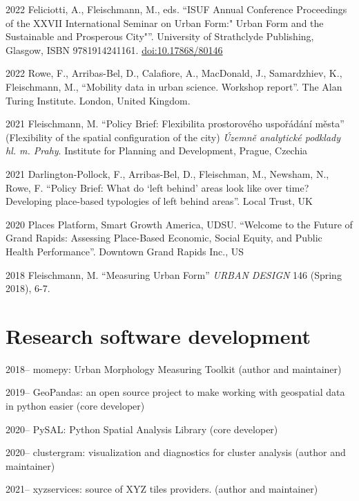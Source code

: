 \documentclass[12pt,a4paper]{report}
\begin{document}
    \begin{tablist}

        \item[2022] \tab{}Feliciotti, A., Fleischmann, M., eds. \enquote{ISUF Annual Conference Proceedings of the XXVII International Seminar on Urban Form:" Urban Form and the Sustainable and Prosperous City"}. University of Strathclyde Publishing, Glasgow, ISBN 9781914241161. \href{https://doi.org/10.17868/80146}{doi:10.17868/80146}
        \item[2022] \tab{}Rowe, F., Arribas-Bel, D., Calafiore, A., MacDonald, J., Samardzhiev, K., Fleischmann, M., \enquote{Mobility data in urban science. Workshop report}. The Alan Turing Institute. London, United Kingdom.
        \item[2021] \tab{}Fleischmann, M. \enquote{Policy Brief: Flexibilita prostorového uspořádání města} (Flexibility of the spatial configuration of the city) \textit{Územně analytické podklady hl. m. Prahy}. Institute for Planning and Development, Prague, Czechia
        \item[2021] \tab{}Darlington-Pollock, F., Arribas-Bel, D., Fleischman, M., Newsham, N., Rowe, F. \enquote{Policy Brief: What do ‘left behind’ areas look like over time? Developing place-based typologies of left behind areas}. Local Trust, UK
        \item[2020] \tab{}Places Platform, Smart Growth America, UDSU. \enquote{Welcome to the Future of Grand Rapids: Assessing Place-Based Economic, Social Equity, and Public Health Performance}. Downtown Grand Rapids Inc., US
        \item[2018] \tab{}Fleischmann, M. \enquote{Measuring Urban Form} \textit{URBAN DESIGN} 146 (Spring 2018), 6-7.

    \end{tablist}

    \section*{Research software development}

    \begin{tablist}

        \item[2018--] \tab{}momepy: Urban Morphology Measuring Toolkit (author and maintainer)
        \item[2019--] \tab{}GeoPandas: an open source project to make working with geospatial data in python easier (core developer)
        \item[2020--] \tab{}PySAL: Python Spatial Analysis Library (core developer)
        \item[2020--] \tab{}clustergram: visualization and diagnostics for cluster analysis (author and maintainer)
        \item[2021--] \tab{}xyzservices: source of XYZ tiles providers. (author and maintainer)

    \end{tablist}
\end{document}
